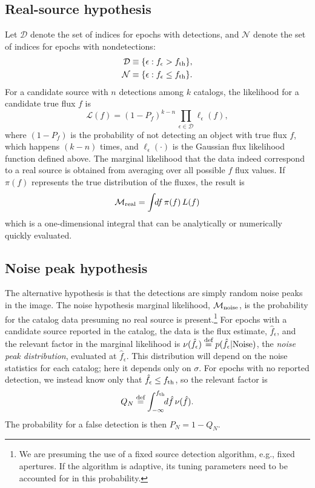 \documentclass[twocolumn]{emulateapj}
\newcommand*{\defeq}{\stackrel{\text{def}}{=}}
\newcommand{\eind}{\epsilon}  %
\newcommand{\like}{\mathcal{L}}  %
\newcommand{\flike}{\ell}  %
\newcommand{\mlike}{\mathcal{M}}  %
\newcommand{\flux}{f}
\newcommand{\fest}{\hat{\flux}}  %
\newcommand{\dtxn}{\mathcal{D}}  %
\newcommand{\ndtxn}{\mathcal{N}}  %
\newcommand{\fth}{\flux_{\rm th}}
\newcommand{\npd}{\nu}  %
\begin{document}
\subsection{Real-source hypothesis}
\noindent
Let $\dtxn$ denote the set of indices for epochs with detections, and $\ndtxn$ denote the set of indices for epochs with nondetections:
\begin{equation}
\begin{split}
\dtxn  &\equiv \{\eind : \flux_\eind > \fth\},\\
\ndtxn &\equiv \{\eind : \flux_\eind \le \fth\}.
\end{split}
\label{D-ND-sets}
\end{equation}
For a candidate source with $n$ detections among $k$ catalogs, the likelihood for a candidate true flux $f$ is
%
\begin{equation}
\like(f) = (1\!-\!P_f)^{k-n}\,\prod_{\eind \in \dtxn} \flike_\eind(\flux),
\end{equation}
%
where \mbox{$(1\!-\!P_f)$} is the probability of not detecting an object with true flux $f$, which happens \mbox{$(k\!-\!n)$} times, and $\flike_\eind(\cdot)$ is the Gaussian flux likelihood function defined above.
%
The marginal likelihood that the data indeed correspond to a real source is obtained from averaging over all possible $f$ flux values. 
If $\pi(f)$ represents the true distribution of the fluxes, the result is
%
\begin{equation}
\mlike_{\rm{}real} = \int\!\!df\,\pi(f)\,L(f)
\end{equation}
%
which is a one-dimensional integral that can be analytically or numerically quickly evaluated.


\subsection{Noise peak hypothesis}\label{sec:peaks}
\noindent
%
The alternative hypothesis is that the detections are simply random noise peaks in the image.
The noise hypothesis marginal likelihood, $\mlike_{\rm noise}$, is the probability for the catalog data presuming no real source is present.\footnote{We are presuming the use of a fixed source detection algorithm, e.g., fixed apertures. 
If the algorithm is adaptive, its tuning parameters need to be accounted for in this probability.}
For epochs with a candidate source reported in the catalog, the data is the flux estimate, $\fest_\eind$, and the relevant factor in the marginal likelihood is $\npd(\fest_\eind) \defeq p(\fest_\eind|\rm{Noise})$, the \emph{noise peak distribution}, evaluated at $\fest_\eind$.
This distribution will depend on the noise statistics for each catalog; here it depends only on $\sigma$.
For epochs with no reported detection, we instead know only that $\fest_\eind \le \fth$, so the relevant factor is
\begin{equation} \label{eq:Q-noise}
Q_N \defeq \int_{-\infty}^{\fth}\!\!d\fest\,\npd(\fest).
\end{equation}
The probability for a false detection is then $P_N = 1 - Q_N$.
\end{document}
